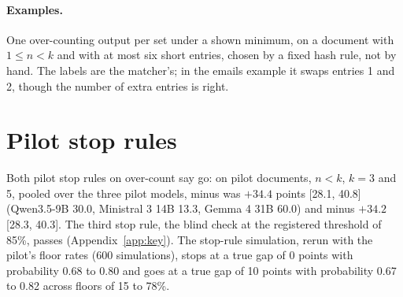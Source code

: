 \paragraph{Examples.}
One over-counting output per set under a shown minimum, on a document with $1 \leq n < k$ and with at most six short entries, chosen by a fixed hash rule, not by hand.
The labels are the matcher's; in the emails example it swaps entries 1 and 2, though the number of extra entries is right.



\section{Pilot stop rules}
\label{app:stoprules}

Both pilot stop rules on over-count say go: on pilot documents, $n < k$, $k = 3$ and 5, pooled over the three pilot models,  minus  was $+34.4$ points [28.1, 40.8] (Qwen3.5-9B 30.0, Ministral 3 14B 13.3, Gemma 4 31B 60.0) and  minus  $+34.2$ [28.3, 40.3].
The third stop rule, the blind check at the registered threshold of 85\%, passes (Appendix~\ref{app:key}).
The stop-rule simulation, rerun with the pilot's floor rates (600 simulations), stops at a true gap of 0 points with probability 0.68 to 0.80 and goes at a true gap of 10 points with probability 0.67 to 0.82 across floors of 15 to 78\%.
